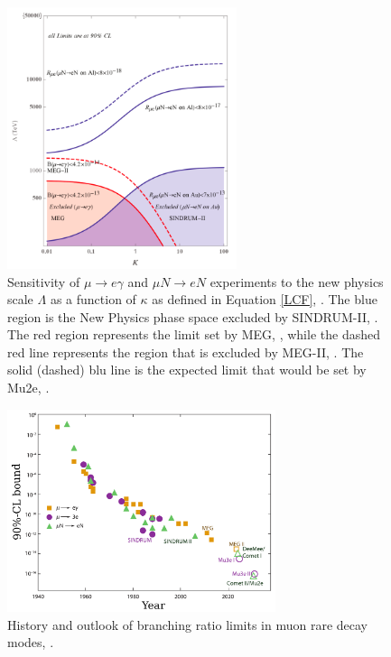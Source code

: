 \begin{figure}[!h]
\centering
\includegraphics[width =0.6\textwidth]{figures/png/Screenshot_20240313_120457.png}
\caption[Sensitivity of $\mu \rightarrow e\gamma$ and $\mu N \rightarrow eN$ experiments.]{Sensitivity of $\mu \rightarrow e\gamma$ and $\mu N \rightarrow eN$ experiments to the new physics
scale $\Lambda$ as a function of $\kappa$ as defined in Equation \ref{LCF}, \cite{CGroup:2022tli}. The blue region is the New
Physics phase space excluded by SINDRUM-II, \cite{SINDRUMII:2006dvw}. The red region represents the
limit set by MEG, \cite{megi}, while the dashed red line represents the region that is
excluded by MEG-II, \cite{megiicollaboration2024search}. The solid (dashed) blu line is the
expected limit that would be set by Mu2e, \cite{universe9010054}.}
\label{fig:muchannelbr}
\end{figure}
\begin{figure}[!h]
  \centering
  \includegraphics[width =0.7\textwidth]{figures/png/Screenshot_20240307_161549.png}
  \caption[Branching ratio limits in muon rare decay modes.]{History and outlook of branching ratio limits in muon rare decay modes, \cite{MARCIANO1977303}.}
  \label{fig:muchannel}
  \end{figure}
